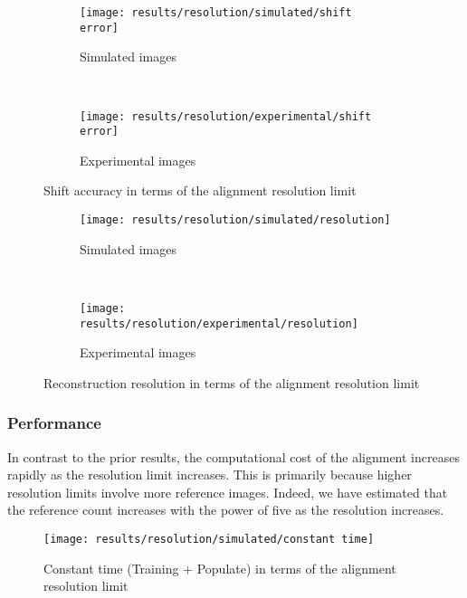 \documentclass[../main.tex]{subfiles}
\begin{document}
\begin{figure}[htbp]
    \centering
    \begin{subfigure}[b]{.8\textwidth}
         \centering
         \texttt{[image: results/resolution/simulated/shift error]}
         \caption{Simulated images}
    \end{subfigure}\\
    \vspace{2em}
    \begin{subfigure}[b]{.8\textwidth}
         \centering
         \texttt{[image: results/resolution/experimental/shift error]}
         \caption{Experimental images}
    \end{subfigure}
    \caption{Shift accuracy in terms of the alignment resolution limit}
    \label{fig:5:resolution_shift_accuracy}
\end{figure}

\begin{figure}[htbp]
    \centering
    \begin{subfigure}[b]{.8\textwidth}
         \centering
         \texttt{[image: results/resolution/simulated/resolution]}
         \caption{Simulated images}
    \end{subfigure}\\
    \vspace{2em}
    \begin{subfigure}[b]{.8\textwidth}
         \centering
         \texttt{[image: results/resolution/experimental/resolution]}
         \caption{Experimental images}
    \end{subfigure}
    \caption{Reconstruction resolution in terms of the alignment resolution limit}
    \label{fig:5:resolution_resolution}
\end{figure}

\subsubsection{Performance}
In contrast to the prior results, the computational cost of the alignment increases rapidly as the resolution limit increases. This is primarily because higher resolution limits involve more reference images. Indeed, we have estimated that the reference count increases with the power of five as the resolution increases.  

\begin{figure}[htbp]
    \centering
    \texttt{[image: results/resolution/simulated/constant time]}
    \caption{Constant time (Training + Populate) in terms of the alignment resolution limit}
    \label{fig:5:resolution_constant}
\end{figure}
\end{document}
